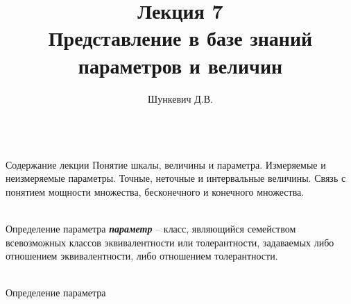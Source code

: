 \title{Лекция 7\\Представление в базе знаний параметров и величин}   
\author[]{Шункевич Д.В.}

\begin{frame}
	\titlepage
\end{frame}

\begin{frame}{\\Содержание лекции}
	\topline
	\justifying
	Понятие шкалы, величины и параметра. Измеряемые и неизмеряемые параметры. Точные, неточные и интервальные величины. Связь с понятием мощности множества, бесконечного и конечного множества.
\end{frame}


\begin{frame}{\\Определение параметра}
	\topline
	\justifying
	\textbf{\textit{параметр}} -- класс, являющийся семейством всевозможных классов эквивалентности или толерантности, задаваемых либо отношением эквивалентности, либо отношением толерантности.\\		
\end{frame}

\begin{frame}{\\Определение параметра}
	\topline
	\justifying
	\begin{SCn}
	\end{SCn}
\end{frame}

